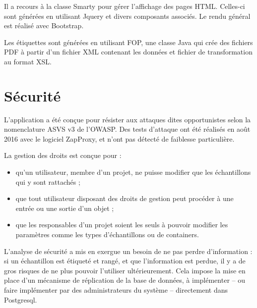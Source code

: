 Il a recours à la classe Smarty pour gérer l'affichage des pages HTML. Celles-ci sont générées en utilisant Jquery et divers composants associés. Le rendu général est réalisé avec Bootstrap.

Les étiquettes sont générées en utilisant FOP, une classe Java qui crée des fichiers PDF à partir d'un fichier XML contenant les données et fichier de transformation au format XSL.

\section{Sécurité}

L'application a été conçue pour résister aux attaques dites opportunistes selon la nomenclature ASVS v3 de l'OWASP. Des tests d'attaque ont été réalisés en août 2016 avec le logiciel ZapProxy, et n'ont pas détecté de faiblesse particulière.

La gestion des droits est conçue pour :
\begin{itemize}
\item qu'un utilisateur, membre d'un projet, ne puisse modifier que les échantillons qui y sont rattachés ;
\item que tout utilisateur disposant des droits de gestion peut procéder à une entrée ou une sortie d'un objet ;
\item que les responsables d'un projet soient les seuls à pouvoir modifier les paramètres comme les types d'échantillons ou de containers.
\end{itemize}
L'analyse de sécurité a mis en exergue un besoin de ne pas perdre d'information : si un échantillon est étiqueté et rangé, et que l'information est perdue, il y a de gros risques de ne plus pouvoir l'utiliser ultérieurement. Cela impose la mise en place d'un mécanisme de réplication de la base de données, à implémenter -- ou faire implémenter par des administrateurs du système -- directement dans Postgresql.

